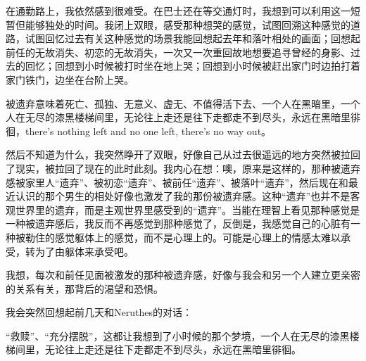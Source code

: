 在通勤路上，我依然感到很难受。在巴士还在等交通灯时，我想到可以利用这一短暂但能够独处的时间。我闭上双眼，感受那种想哭的感觉，试图回溯这种感觉的道路，试图回忆过去有关这种感觉的场景\pozhehao{}我能回想起去年和落叶相处的画面；回想起前任的无故消失、初恋的无故消失，一次又一次重回故地想要追寻曾经的身影、过去的回忆；回想到小时候被打时坐在地上哭；回想到小时候被赶出家门时边拍打着家门铁门，边坐在台阶上哭。

被遗弃意味着死亡、孤独、无意义、虚无、不值得活下去、一个人在黑暗里，一个人在无尽的漆黑楼梯间里，无论往上走还是往下走都走不到尽头，永远在黑暗里徘徊，there's nothing left and no one left, there's no way out。

然后不知道为什么，我突然睁开了双眼，好像自己从过去很遥远的地方突然被拉回了现实，被拉回了现在的此时此刻。我内心在想：噢，原来是这样的，那种被遗弃感\pozhehao{}被家里人“遗弃”、被初恋“遗弃”、被前任“遗弃”、被落叶“遗弃”，然后现在和最近认识的那个男生的相处好像也激发了我的那份被遗弃感。这种“遗弃”也并不是客观世界里的遗弃，而是主观世界里感受到的“遗弃”。当能在理智上看见那种感觉是一种被遗弃感后，我反而不再感觉到那种感觉了，反倒是，我感觉自己的心脏有一种被勒住的感觉\pozhehao{}躯体上的感觉，而不是心理上的。可能是心理上的情感太难以承受，转为了由躯体来承受吧。

我想，每次和前任见面被激发的那种被遗弃感，好像与我会和另一个人建立更亲密的关系有关，那背后的渴望和恐惧。

\tristarsepline

我会突然回想起前几天和Neruthes的对话：


“救赎”、“充分摆脱”，这都让我想到了小时候的那个梦境，一个人在无尽的漆黑楼梯间里，无论往上走还是往下走都走不到尽头，永远在黑暗里徘徊。

\tristarsepline

